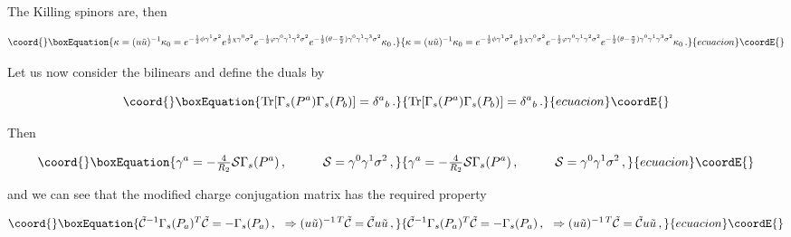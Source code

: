 \documentclass[12pt,a4paper]{article}
\begin{document}
The Killing spinors are, then

\begin{equation}\coord{}\boxEquation{
\kappa = (u \tilde{u})^{-1}\kappa_{0}=   
e^{-\frac{1}{2}\phi \gamma^{1}\sigma^{2}}
e^{\frac{1}{2}\chi \gamma^{0}\sigma^{2}}
 e^{-\frac{1}{2}\varphi \gamma^{0}\gamma^{1}\gamma^{2}\sigma^{2}} 
e^{-\frac{1}{2}(\theta-\frac{\pi}{2}) 
\gamma^{0}\gamma^{1}\gamma^{3}\sigma^{2}}\kappa_{0}\, .
}{
\kappa = (u \tilde{u})^{-1}\kappa_{0}=   
e^{-\frac{1}{2}\phi \gamma^{1}\sigma^{2}}
e^{\frac{1}{2}\chi \gamma^{0}\sigma^{2}}
 e^{-\frac{1}{2}\varphi \gamma^{0}\gamma^{1}\gamma^{2}\sigma^{2}} 
e^{-\frac{1}{2}(\theta-\frac{\pi}{2}) 
\gamma^{0}\gamma^{1}\gamma^{3}\sigma^{2}}\kappa_{0}\, .
}{ecuacion}\coordE{}\end{equation}

Let us now consider the bilinears \coordHE{}
and define the duals \coordHE{} by 

\begin{equation}\coord{}\boxEquation{
{\rm Tr}[\Gamma_{s}(P^{a})\Gamma_{s}(P_{b})]  =\delta^{a}{}_{b}\, .
}{
{\rm Tr}[\Gamma_{s}(P^{a})\Gamma_{s}(P_{b})]  =\delta^{a}{}_{b}\, .
}{ecuacion}\coordE{}\end{equation}

\noindent 
Then

\begin{equation}\coord{}\boxEquation{
\gamma^{a}=-{\textstyle\frac{4}{R_{2}}} \mathcal{S}\Gamma_{s}(P^{a})\, ,
\hspace{1cm}
\mathcal{S} = \gamma^{0}\gamma^{1}\sigma^{2}\, ,
}{
\gamma^{a}=-{\textstyle\frac{4}{R_{2}}} \mathcal{S}\Gamma_{s}(P^{a})\, ,
\hspace{1cm}
\mathcal{S} = \gamma^{0}\gamma^{1}\sigma^{2}\, ,
}{ecuacion}\coordE{}\end{equation}

\noindent 
and we can see that the modified charge conjugation matrix
\coordHE{} has the required
property

\begin{equation}\coord{}\boxEquation{
\tilde{\mathcal{C}}^{-1}\Gamma_{s}(P_{a})^{T}\tilde{\mathcal{C}}
= -\Gamma_{s}(P_{a})\, ,
\,\,\,\,
\Rightarrow 
(u \tilde{u})^{-1\, T}\tilde{\mathcal{C}} = \tilde{\mathcal{C}}
u \tilde{u}\, ,
}{
\tilde{\mathcal{C}}^{-1}\Gamma_{s}(P_{a})^{T}\tilde{\mathcal{C}}
= -\Gamma_{s}(P_{a})\, ,
\,\,\,\,
\Rightarrow 
(u \tilde{u})^{-1\, T}\tilde{\mathcal{C}} = \tilde{\mathcal{C}}
u \tilde{u}\, ,
}{ecuacion}\coordE{}\end{equation}
\end{document}
